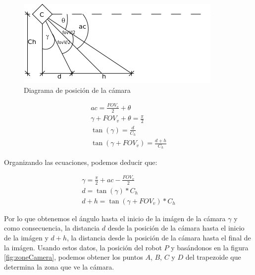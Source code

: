 \begin{figure}[htp]
\begin{center}
\includegraphics{comportamientos/angleCamera.png}
\caption{Diagrama de posici\'on de la c\'amara}
\label{fig:angleCamera}
\end{center}
\end{figure}

\begin{eqnarray}
ac = \frac{FOV_v}{2} + \theta\\
\gamma + FOV_v + \theta = \frac{\pi}{2}\\
\tan(\gamma) = \frac{d}{C_h}\\
\tan(\gamma+FOV_v) = \frac{d+h}{C_h}
\end{eqnarray}

Organizando las ecuaciones, podemos deducir que:

\begin{eqnarray}
\gamma = \frac{\pi}{2} + ac - \frac{FOV_v}{2}\\
\label{eqn:distance_d}
d = \tan(\gamma) * C_h \\
\label{eqn:distance_dh}
d+h = \tan(\gamma+FOV_v) * C_h
\end{eqnarray}

Por lo que obtenemos el \'angulo hasta el inicio de la im\'agen de la c\'amara
$\gamma$ y como consecuencia, la distancia $d$ desde la posici\'on de la
c\'amara hasta el inicio de la im\'agen y $d+h$, la distancia desde la
posici\'on de la c\'amara hasta el final de la im\'agen. Usando estos datos,
la posici\'on del robot $P$ y bas\'andonos en la figura \ref{fig:zoneCamera},
podemos obtener los puntos $A$, $B$, $C$ y $D$ del trapezoide que determina la
zona que ve la c\'amara.

